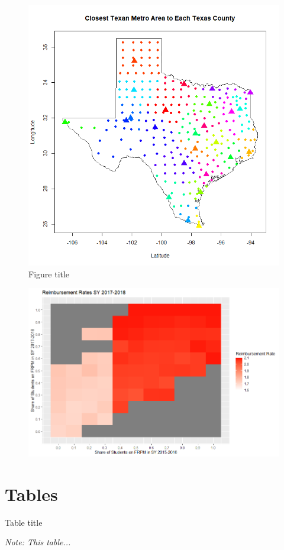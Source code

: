 \documentclass[12pt]{article}
\begin{document}
\begin{figure}[tbh]
	\caption{Figure title}\label{fig1}
		\includegraphics[width=\linewidth, keepaspectratio]{"Texas_county_cost_of_living_map.png"}
		
\end{figure}


\begin{figure}
	\centering
	\includegraphics[width = \linewidth, keepaspectratio] {"heatmap_april_15_2024.png"}
\end{figure}

\section{Tables}

\begin{table}[tbh]
    \caption{Table title}
    \label{table1}
        \begin{center}
        \end{center}
    \textit{\scriptsize{}Note: This table...}{\scriptsize \par}
    \end{table}
\end{document}
